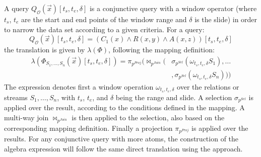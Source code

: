 A query $Q_{\mathcal{O}}(\vec{x})[t_s,t_e,\delta]$ is a conjunctive query with a window operator (where $t_s$, $t_e$ are the start and end points of the window range and $\delta$ is the slide) in order to narrow the data set according to a given criteria. 
For a query:
\begin{equation*}
  Q_{\mathcal{O}}(\vec{x})[t_s,t_e,\delta] = (C_1(x) \wedge R(x,y) \wedge A(x,z)) [t_s,t_e,\delta]
\end{equation*}
the translation is given by $\lambda(\Phi)$, following the mapping definition:
\begin{align*}
\lambda(\Phi_{S_1,\ldots,S_n}(\vec{x})[t_s,t_e,\delta])=\pi_{p^{Proj}}(\Join_{p^{Join}}
(&\sigma_{p^{Sel}}(\omega_{t_s,t_e,\delta}S_1),\dots \\ &,\sigma_{p^{Sel}}(\omega_{t_s,t_e,\delta}S_n)))
\end{align*}
The expression denotes first a window operation $\omega_{t_s,t_e,\delta}$ over the relations or streams $S_1,\dots, S_n$, with $t_s$, $t_e$, and $\delta$ being the range and slide. 
A selection $\sigma_{p^{Sel}}$ is applied over the result, according to the conditions defined in the mapping. 
A multi-way join $\Join_{p^{Join}}$ is then applied to the selection, also based on the corresponding mapping definition. 
Finally a projection $\pi_{p^{Proj}}$ is applied over the results. 
For any conjunctive query with more atoms, the construction of the algebra expression will follow the same direct translation using the \gav approach.
%
